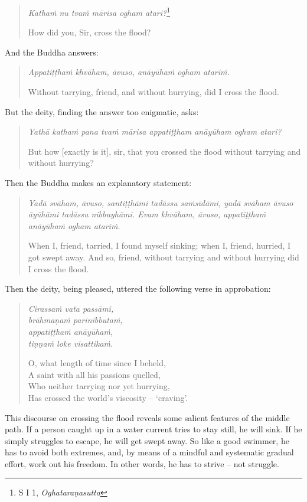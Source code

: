 \begin{quote}
\emph{Kathaṁ nu tvaṁ mārisa ogham atari?}\footnote{S I 1, \emph{Oghataraṇasutta}}

How did you, Sir, cross the flood?
\end{quote}

And the Buddha answers:

\begin{quote}
\emph{Appatiṭṭhaṁ khvāham, āvuso, anāyūhaṁ ogham atariṁ.}

Without tarrying, friend, and without hurrying, did I cross the flood.
\end{quote}

But the deity, finding the answer too enigmatic, asks:

\begin{quote}
\emph{Yathā kathaṁ pana tvaṁ mārisa appatiṭṭham anāyūham ogham atari?}

But how {[}exactly is it{]}, sir, that you crossed the flood without tarrying and without hurrying?
\end{quote}

Then the Buddha makes an explanatory statement:

\begin{quote}
\emph{Yadā svāham, āvuso, santiṭṭhāmi tadāssu saṁsīdāmi, yadā svāham āvuso āyūhāmi tadāssu nibbuyhāmi. Evam khvāham, āvuso, appatiṭṭhaṁ anāyūhaṁ ogham atariṁ.}

When I, friend, tarried, I found myself sinking; when I, friend, hurried, I got swept away. And so, friend, without tarrying and without hurrying did I cross the flood.
\end{quote}

Then the deity, being pleased, uttered the following verse in approbation:

\begin{quote}
\emph{Cirassaṁ vata passāmi,}\\
\emph{brāhmaṇaṁ parinibbutaṁ,}\\
\emph{appatiṭṭhaṁ anāyūhaṁ,}\\
\emph{tiṇṇaṁ loke visattikaṁ.}

O, what length of time since I beheld,\\
A saint with all his passions quelled,\\
Who neither tarrying nor yet hurrying,\\
Has crossed the world's viscosity -- `craving'.
\end{quote}

This discourse on crossing the flood reveals some salient features of the middle path. If a person caught up in a water current tries to stay still, he will sink. If he simply struggles to escape, he will get swept away. So like a good swimmer, he has to avoid both extremes, and, by means of a mindful and systematic gradual effort, work out his freedom. In other words, he has to strive -- not struggle.

